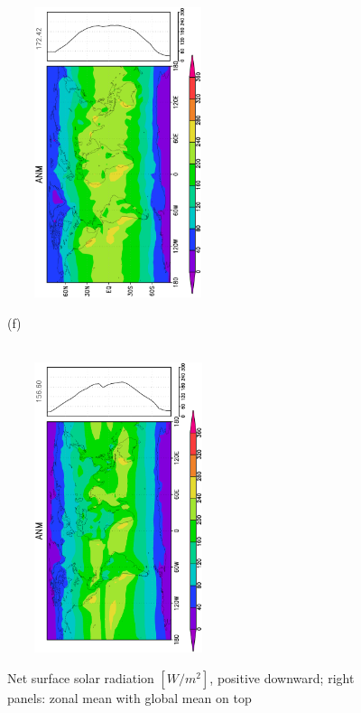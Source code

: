 \documentclass[12pt,a4paper,twoside,openright,headinclude,liststotoc,bibtotoc]{scrreprt}
\begin{document}
\begin{figure}[H]
{\includegraphics[height=8.5cm,width=6.5cm,angle=-90]
{eps/zonaltmsfcsolrad176.eps}
}
\parbox{8.5cm}{\hspace{0.45cm}\begin{scriptsize}(f)\end{scriptsize} \vspace{-0.7cm} \\
\includegraphics[height=8.5cm,width=6.5cm,angle=-90]
{eps/zonalt21tmsfcsolrad.eps}
}
\caption[Net surface solar radiation]{Net surface solar radiation $[W/m^2]$, positive downward; right panels: zonal mean with global mean on top}
\label{img:sfcsolrad}
\end{figure}
\end{document}
